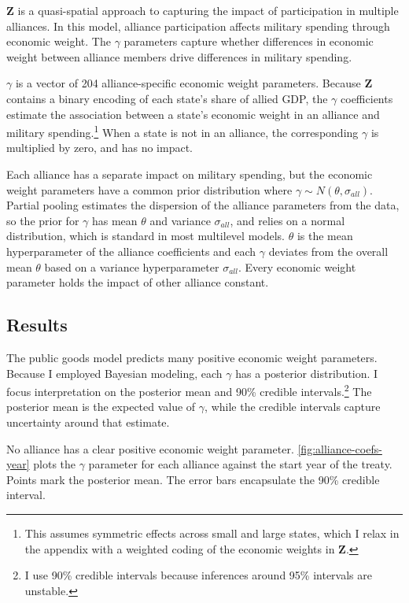 \documentclass[12pt]{article}
\begin{document}
$\textbf{Z}$ is a quasi-spatial approach to capturing the impact of participation in multiple alliances.
In this model, alliance participation affects military spending through economic weight.  
The $\gamma$ parameters capture whether differences in economic weight between alliance members drive differences in military spending. 


$\gamma$ is a vector of 204 alliance-specific economic weight parameters.  
Because \textbf{Z} contains a binary encoding of each state's share of allied GDP, the $\gamma$ coefficients estimate the association between a state's economic weight in an alliance and military spending.\footnote{This assumes symmetric effects across small and large states, which I relax in the appendix with a weighted coding of the economic weights in $\textbf{Z}$.} 
When a state is not in an alliance, the corresponding $\gamma$ is multiplied by zero, and has no impact. 


Each alliance has a separate impact on military spending, but the economic weight parameters have a common prior distribution where $\gamma \sim N(\theta, \sigma_{all})$.
Partial pooling estimates the dispersion of the alliance parameters from the data, so the prior for $\gamma$ has mean $\theta$ and variance $\sigma_{all}$, and relies on a normal distribution, which is standard in most multilevel models.  
$\theta$ is the mean hyperparameter of the alliance coefficients and each $\gamma$ deviates from the overall mean $\theta$ based on a variance hyperparameter $\sigma_{all}$.
Every economic weight parameter holds the impact of other alliance constant. 
    


\subsection{Results} 


The public goods model predicts many positive economic weight parameters. 
Because I employed Bayesian modeling, each $\gamma$ has a posterior distribution.
I focus interpretation on the posterior mean and 90\% credible intervals.\footnote{I use 90\% credible intervals because inferences around 95\% intervals are unstable.}
The posterior mean is the expected value of $\gamma$, while the credible intervals capture uncertainty around that estimate.  


No alliance has a clear positive economic weight parameter.
\autoref{fig:alliance-coefs-year} plots the $\gamma$ parameter for each alliance against the start year of the treaty.
Points mark the posterior mean. 
The error bars encapsulate the 90\% credible interval.
\end{document}
